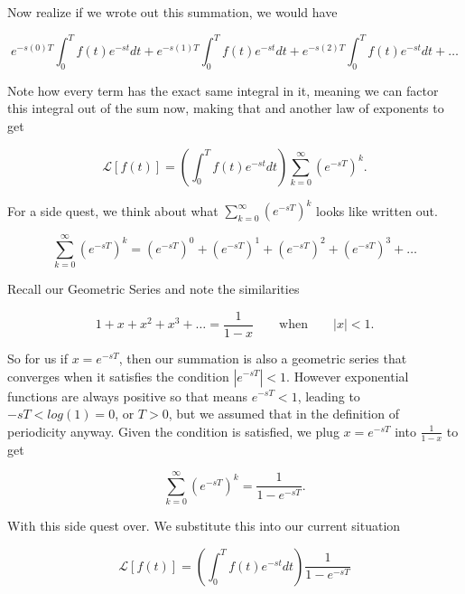 \documentclass[12pt]{article}
\newcommand{\lp}{\mathscr{L}}
\begin{document}
Now realize if we wrote out this summation, we would have

\begin{equation*}
    e^{-s(0)T} \int_{0}^{T} f(t) e^{-st} dt + e^{-s(1)T} \int_{0}^{T} f(t) e^{-st} dt + e^{-s(2)T} \int_{0}^{T} f(t) e^{-st} dt + \ldots
\end{equation*}

Note how every term has the exact same integral in it, meaning we can factor this integral out of the sum now, making that and another law of exponents to get

\begin{equation*}
    \lp[f(t)]=\left( \int_{0}^{T} f(t) e^{-st} dt \right)\sum_{k=0}^\infty \left(e^{-sT}\right)^k.
\end{equation*}

For a side quest, we think about what $\sum_{k=0}^\infty \left(e^{-sT}\right)^k$ looks like written out.

\begin{equation*}
    \sum_{k=0}^\infty \left(e^{-sT}\right)^k = \left(e^{-sT}\right)^0+\left(e^{-sT}\right)^1+\left(e^{-sT}\right)^2+\left(e^{-sT}\right)^3+\ldots
\end{equation*}

Recall our Geometric Series and note the similarities

\begin{equation*} 
  1+x+x^2+x^3+\ldots= \frac{1}{1-x} \qquad \text{when} \qquad |x|<1.
\end{equation*}

So for us if $x=e^{-sT}$, then our summation is also a geometric series that converges when it satisfies the condition $|e^{-sT}|<1$. However exponential functions are always positive so that means $e^{-sT}<1$, leading to $-sT<log(1)=0$, or $T>0$, but we assumed that in the definition of periodicity anyway. Given the condition is satisfied, we plug $x=e^{-sT}$ into $\frac{1}{1-x}$ to get

\begin{equation*}
    \sum_{k=0}^\infty \left(e^{-sT}\right)^k = \frac{1}{1-e^{-sT}}.
\end{equation*}

With this side quest over. We substitute this into our current situation

\begin{equation*}
    \lp[f(t)]=\left( \int_{0}^{T} f(t) e^{-st} dt \right)\frac{1}{1-e^{-sT}}
\end{equation*}
\end{document}
